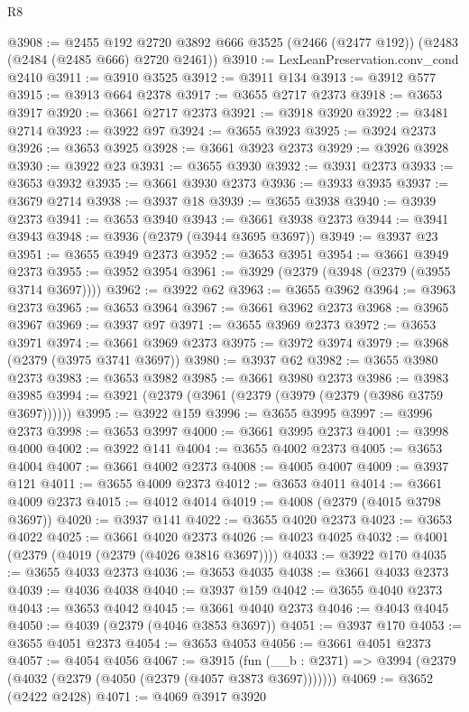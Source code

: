 \begin{lexlean}{R8}
\begin{coremodule}
@3908 := @2455
    @192
    @2720
    @3892
    @666
    @3525
    (@2466 (@2477 @192))
    (@2483 (@2484 (@2485 @666) @2720 @2461))
@3910 := LexLeanPreservation.conv_cond @2410
@3911 := @3910 @3525
@3912 := @3911 @134
@3913 := @3912 @577
@3915 := @3913 @664 @2378
@3917 := @3655 @2717 @2373
@3918 := @3653 @3917
@3920 := @3661 @2717 @2373
@3921 := @3918 @3920
@3922 := @3481 @2714
@3923 := @3922 @97
@3924 := @3655 @3923
@3925 := @3924 @2373
@3926 := @3653 @3925
@3928 := @3661 @3923 @2373
@3929 := @3926 @3928
@3930 := @3922 @23
@3931 := @3655 @3930
@3932 := @3931 @2373
@3933 := @3653 @3932
@3935 := @3661 @3930 @2373
@3936 := @3933 @3935
@3937 := @3679 @2714
@3938 := @3937 @18
@3939 := @3655 @3938
@3940 := @3939 @2373
@3941 := @3653 @3940
@3943 := @3661 @3938 @2373
@3944 := @3941 @3943
@3948 := @3936 (@2379 (@3944 @3695 @3697))
@3949 := @3937 @23
@3951 := @3655 @3949 @2373
@3952 := @3653 @3951
@3954 := @3661 @3949 @2373
@3955 := @3952 @3954
@3961 := @3929 (@2379 (@3948 (@2379 (@3955 @3714 @3697))))
@3962 := @3922 @62
@3963 := @3655 @3962
@3964 := @3963 @2373
@3965 := @3653 @3964
@3967 := @3661 @3962 @2373
@3968 := @3965 @3967
@3969 := @3937 @97
@3971 := @3655 @3969 @2373
@3972 := @3653 @3971
@3974 := @3661 @3969 @2373
@3975 := @3972 @3974
@3979 := @3968 (@2379 (@3975 @3741 @3697))
@3980 := @3937 @62
@3982 := @3655 @3980 @2373
@3983 := @3653 @3982
@3985 := @3661 @3980 @2373
@3986 := @3983 @3985
@3994 := @3921 (@2379 (@3961 (@2379 (@3979 (@2379 (@3986 @3759 @3697))))))
@3995 := @3922 @159
@3996 := @3655 @3995
@3997 := @3996 @2373
@3998 := @3653 @3997
@4000 := @3661 @3995 @2373
@4001 := @3998 @4000
@4002 := @3922 @141
@4004 := @3655 @4002 @2373
@4005 := @3653 @4004
@4007 := @3661 @4002 @2373
@4008 := @4005 @4007
@4009 := @3937 @121
@4011 := @3655 @4009 @2373
@4012 := @3653 @4011
@4014 := @3661 @4009 @2373
@4015 := @4012 @4014
@4019 := @4008 (@2379 (@4015 @3798 @3697))
@4020 := @3937 @141
@4022 := @3655 @4020 @2373
@4023 := @3653 @4022
@4025 := @3661 @4020 @2373
@4026 := @4023 @4025
@4032 := @4001 (@2379 (@4019 (@2379 (@4026 @3816 @3697))))
@4033 := @3922 @170
@4035 := @3655 @4033 @2373
@4036 := @3653 @4035
@4038 := @3661 @4033 @2373
@4039 := @4036 @4038
@4040 := @3937 @159
@4042 := @3655 @4040 @2373
@4043 := @3653 @4042
@4045 := @3661 @4040 @2373
@4046 := @4043 @4045
@4050 := @4039 (@2379 (@4046 @3853 @3697))
@4051 := @3937 @170
@4053 := @3655 @4051 @2373
@4054 := @3653 @4053
@4056 := @3661 @4051 @2373
@4057 := @4054 @4056
@4067 := @3915
    (fun (__b : @2371) => @3994 (@2379 (@4032 (@2379 (@4050 (@2379 (@4057 @3873 @3697)))))))
@4069 := @3652 (@2422 @2428)
@4071 := @4069 @3917 @3920

\end{coremodule}
\end{lexlean}
